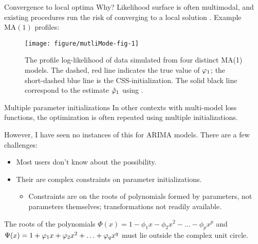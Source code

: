 \documentclass[aspectratio=169]{beamer}\usepackage[]{graphicx}\usepackage[]{xcolor}
\makeatletter
\def\maxwidth{ %
  \ifdim\Gin@nat@width>\linewidth
    \linewidth
  \else
    \Gin@nat@width
  \fi
}
\newenvironment{knitrout}{}{} %
\makeatother
\begin{document}
\begin{frame}{Convergence to local optima}
  Why? Likelihood surface is often multimodal, and existing procedures run the risk of converging to a local solution \citep{ripley2002}. Example $\mathrm{MA}(1)$ profiles:


  

\begin{figure}[ht]
\begin{knitrout}
\color{fgcolor}
\texttt{[image: figure/mutliMode-fig-1]} 
\end{knitrout}
\caption{\label{fig:multiMode}The profile log-likelihood of data simulated from four distinct MA(1) models. The dashed, red line indicates the true value of $\varphi_1$; the short-dashed blue line is the CSS-initialization. The solid black line correspond to the estimate $\hat{\varphi}_1$ using .}
\end{figure}

\end{frame}

\begin{frame}{Multiple parameter initializations}
  In other contexts with multi-model loss functions, the optimization is often repeated using multiple initializations.
  
  However, I have seen \alert{no instances} of this for $\mathrm{ARIMA}$ models. There are a few challenges: 
  \begin{itemize}
    \item Most users don't know about the possibility. 
    \item Their are complex constraints on parameter initializations. 
    \begin{itemize}
      \item Constraints are on the roots of polynomials formed by parameters, not parameters themselves; transformations not readily available.
    \end{itemize}
  \end{itemize}
  \pause
  The roots of the polynomials $\Phi(x) = 1 - \phi_1 x - \phi_2x^2 - \ldots - \phi_px^p$ and $\Psi(x) = 1 + \varphi_1 x + \varphi_2x^2 + \ldots + \varphi_qx^q$ must lie outside the complex unit circle.
\end{frame}
\end{document}
